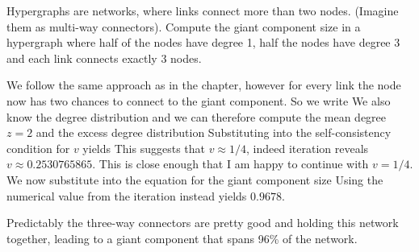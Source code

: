 Hypergraphs are networks, where links connect more than two nodes. 
(Imagine them as multi-way connectors). Compute the giant component size in a hypergraph where half of the nodes have degree 1, half the nodes have degree 3 and each link connects exactly 3 nodes.

\solution
We follow the same approach as in the chapter, however for every link the node now has two chances to connect to the giant component.
So we write
We also know the degree distribution 
and we can therefore compute the mean degree $z=2$ and the excess degree distribution
Substituting into the self-consistency condition for $v$ yields
This suggests that $v\approx 1/4$, indeed iteration reveals 
$v\approx 0.2530765865$. This is close enough that I am happy to continue with $v=1/4$. We now substitute into the equation for the giant component size
Using the numerical value from the iteration instead yields $0.9678$. 

Predictably the three-way connectors are pretty good and holding this network together, leading to a giant component that spans 96\%
of the network. 